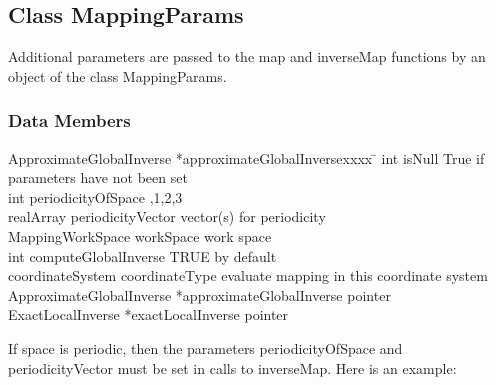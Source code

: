 \documentclass[xcolor=rgb,svgnames,dvipsnames]{article}
\begin{document}
\subsection{Class MappingParams}

Additional parameters are passed to the {\ff map} and {\ff inverseMap} functions
by an object of the class {\ff MappingParams}. 

\subsubsection{ Data Members}
\begin{tabbing}
{\ff ApproximateGlobalInverse *approximateGlobalInversexx}xx \= \kill
{\ff int isNull}                     \> True if parameters have not been set    \\
{\ff int periodicityOfSpace}         ,1,2,3                                \\
{\ff realArray periodicityVector}    \> vector(s) for periodicity               \\
{\ff MappingWorkSpace workSpace}     \> work space                              \\
{\ff int computeGlobalInverse}       \> TRUE by default                         \\
{\ff coordinateSystem coordinateType}\> evaluate mapping in this coordinate system \\
{\ff ApproximateGlobalInverse *approximateGlobalInverse} \> pointer \\
{\ff ExactLocalInverse *exactLocalInverse} \> pointer \\
\end{tabbing}
If space is periodic, then the parameters {\ff periodicityOfSpace} and
{\ff periodicityVector} must be set in calls to {\ff inverseMap}. 
Here is an example:
\end{document}
